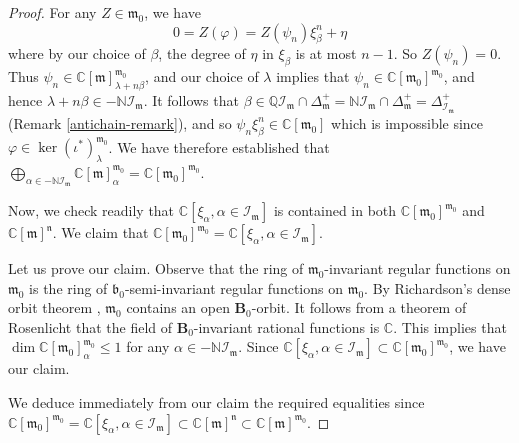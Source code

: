 \documentclass{amsart}
\theoremstyle{definition}
\theoremstyle{remark}
\numberwithin{equation}{section}
\newcommand{\soc}[1]{\mathcal{I}_{#1}}
\newcommand{\group}[1]{\mathbf{#1}}
\begin{document}
\begin{proof}
For any $Z \in \mathfrak{m}_{0}$, we have
$$
0 = Z ( \varphi )  = Z ( \psi_{n}) \xi_{\beta}^{n} + \eta
$$
where by our choice of $\beta$, the degree of $\eta$ in $\xi_{\beta}$ is at most $n-1$. 
So $Z (\psi_{n} ) = 0$.
Thus $\psi_{n} \in \mathbb{C}[\mathfrak{m}]^{\mathfrak{m}_{0}}_{\lambda + n\beta}$, and our choice
of $\lambda$ implies that $\psi_{n} \in \mathbb{C}[\mathfrak{m}_{0}]^{\mathfrak{m}_{0}}$, and hence
$\lambda + n\beta \in -\mathbb{N}\soc{\mathfrak{m}}$. 
It follows that 
$\beta \in \mathbb{Q} \soc{\mathfrak{m}}\cap \Delta_{\mathfrak{m}}^{+} = 
\mathbb{N}\soc{\mathfrak{m}}\cap \Delta_{\mathfrak{m}}^{+} = \Delta_{\soc{\mathfrak{m}}}^{+}$
(Remark \ref{antichain-remark}), and 
so $\psi_{n}\xi_{\beta}^{n}\in \mathbb{C}[\mathfrak{m}_{0}]$
which is impossible since $\varphi \in \ker (\iota^{*})^{\mathfrak{m}_{0}}_{\lambda}$. 
We have therefore established that
$\bigoplus_{\alpha\in -\mathbb{N}\soc{\mathfrak{m}}} 
\mathbb{C} [\mathfrak{m}]_{\alpha}^{\mathfrak{m}_{0}} = 
\mathbb{C}[\mathfrak{m}_{0}]^{\mathfrak{m}_{0}}$. 

Now, we check readily that 
$\mathbb{C}[\xi_{\alpha} , \alpha \in \soc{\mathfrak{m}}]$ is contained in both 
$\mathbb{C}[\mathfrak{m}_{0}]^{\mathfrak{m}_{0}}$ and 
$\mathbb{C}[\mathfrak{m}]^{\mathfrak{n}}$.
We claim that 
$\mathbb{C}[\mathfrak{m}_{0}]^{\mathfrak{m}_{0}} = \mathbb{C}[\xi_{\alpha} , \alpha \in \soc{\mathfrak{m}}]$.

Let us prove our claim. Observe that the ring of $\mathfrak{m}_{0}$-invariant regular functions on 
$\mathfrak{m}_{0}$ is the ring of $\mathfrak{b}_{0}$-semi-invariant regular functions on $\mathfrak{m}_{0}$.
By Richardson's dense orbit theorem \cite{R}, $\mathfrak{m}_{0}$ contains an open $\group{B}_{0}$-orbit. 
It follows from a theorem of Rosenlicht \cite{Ro} that the field of $\group{B}_{0}$-invariant rational functions 
is $\mathbb{C}$. This implies that $\dim \mathbb{C}[\mathfrak{m}_{0}]^{\mathfrak{m}_{0}}_{\alpha} \leqslant 1$
for any $\alpha \in -\mathbb{N}\soc{\mathfrak{m}}$. Since  
$\mathbb{C}[\xi_{\alpha} , \alpha \in \soc{\mathfrak{m}}] \subset 
\mathbb{C}[\mathfrak{m}_{0}]^{\mathfrak{m}_{0}}$,
we have our claim.

We deduce immediately from our claim the required equalities since 
$\mathbb{C}[\mathfrak{m}_{0}]^{\mathfrak{m}_{0}} = 
\mathbb{C}[\xi_{\alpha} , \alpha \in \soc{\mathfrak{m}}] 
\subset \mathbb{C}[\mathfrak{m}]^{\mathfrak{n}} \subset
\mathbb{C} [\mathfrak{m}]^{\mathfrak{m}_{0}}$. 
\end{proof}
\end{document}
